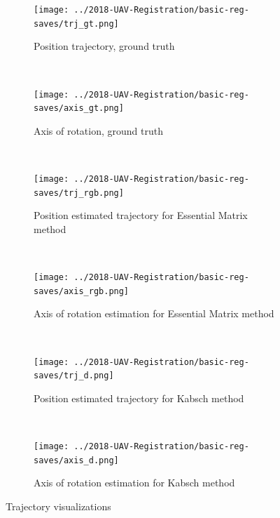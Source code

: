 \documentclass[12pt,a4paper]{article}
\begin{document}
\begin{figure}[t!]
  \centering
  \begin{subfigure}[t]{0.5\textwidth}
  \centering
    \texttt{[image: ../2018-UAV-Registration/basic-reg-saves/trj\_gt.png]}
  \caption{Position trajectory, ground truth}
  \end{subfigure}%
  ~
  \begin{subfigure}[t]{0.5\textwidth}
  \centering
    \texttt{[image: ../2018-UAV-Registration/basic-reg-saves/axis\_gt.png]}
  \caption{Axis of rotation, ground truth}
  \end{subfigure}
  \\
  \begin{subfigure}[t]{0.5\textwidth}
  \centering
    \texttt{[image: ../2018-UAV-Registration/basic-reg-saves/trj\_rgb.png]}
  \caption{Position estimated trajectory for Essential Matrix method}
  \end{subfigure}%
  ~
  \begin{subfigure}[t]{0.5\textwidth}
  \centering
    \texttt{[image: ../2018-UAV-Registration/basic-reg-saves/axis\_rgb.png]}
  \caption{Axis of rotation estimation for Essential Matrix method}
  \end{subfigure}
  \\
  \begin{subfigure}[t]{0.5\textwidth}
  \centering
    \texttt{[image: ../2018-UAV-Registration/basic-reg-saves/trj\_d.png]}
  \caption{Position estimated trajectory for Kabsch method}
  \end{subfigure}%
  ~
  \begin{subfigure}[t]{0.5\textwidth}
  \centering
    \texttt{[image: ../2018-UAV-Registration/basic-reg-saves/axis\_d.png]}
  \caption{Axis of rotation estimation for Kabsch method}
  \end{subfigure}
  \caption{Trajectory visualizations}
  \label{f: D415 offset}
\end{figure}
\end{document}
